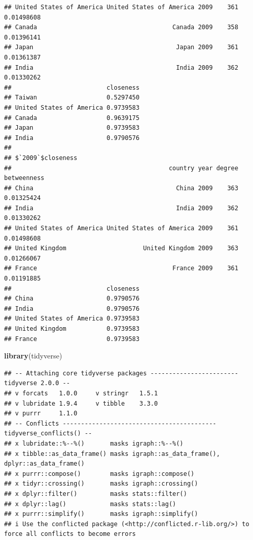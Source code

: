 \documentclass[
]{article}
\newenvironment{Shaded}{\begin{snugshade}}{\end{snugshade}}
\newcommand{\FunctionTok}[1]{\textcolor[rgb]{0.13,0.29,0.53}{\textbf{#1}}}
\newcommand{\NormalTok}[1]{#1}
\begin{document}
\begin{verbatim}
## United States of America United States of America 2009    361  0.01498608
## Canada                                     Canada 2009    358  0.01396141
## Japan                                       Japan 2009    361  0.01361387
## India                                       India 2009    362  0.01330262
##                          closeness
## Taiwan                   0.5297450
## United States of America 0.9739583
## Canada                   0.9639175
## Japan                    0.9739583
## India                    0.9790576
## 
## $`2009`$closeness
##                                           country year degree betweenness
## China                                       China 2009    363  0.01325424
## India                                       India 2009    362  0.01330262
## United States of America United States of America 2009    361  0.01498608
## United Kingdom                     United Kingdom 2009    363  0.01266067
## France                                     France 2009    361  0.01191885
##                          closeness
## China                    0.9790576
## India                    0.9790576
## United States of America 0.9739583
## United Kingdom           0.9739583
## France                   0.9739583
\end{verbatim}

\begin{Shaded}
\begin{Highlighting}[]
\FunctionTok{library}\NormalTok{(tidyverse)}
\end{Highlighting}
\end{Shaded}

\begin{verbatim}
## -- Attaching core tidyverse packages ------------------------ tidyverse 2.0.0 --
## v forcats   1.0.0     v stringr   1.5.1
## v lubridate 1.9.4     v tibble    3.3.0
## v purrr     1.1.0     
## -- Conflicts ------------------------------------------ tidyverse_conflicts() --
## x lubridate::%--%()       masks igraph::%--%()
## x tibble::as_data_frame() masks igraph::as_data_frame(), dplyr::as_data_frame()
## x purrr::compose()        masks igraph::compose()
## x tidyr::crossing()       masks igraph::crossing()
## x dplyr::filter()         masks stats::filter()
## x dplyr::lag()            masks stats::lag()
## x purrr::simplify()       masks igraph::simplify()
## i Use the conflicted package (<http://conflicted.r-lib.org/>) to force all conflicts to become errors
\end{verbatim}
\end{document}
